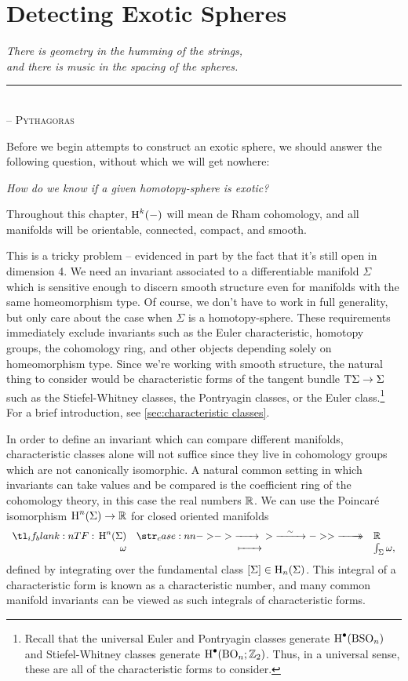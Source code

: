 \chapter{Detecting Exotic Spheres}

\begin{flushleft}
	\textsl{There is geometry in the humming of the strings,}\\
	\textsl{and there is music in the spacing of the spheres.}\\
	\rule[0pt]{21em}{0.5pt}\\
	-- \textsc{Pythagoras}\\
	\vspace{2em}
\end{flushleft}

Before we begin attempts to construct an exotic sphere, we should answer the following question, without which we will get nowhere:
\begin{center}
	\textsl{How do we know if a given homotopy-sphere is exotic?}
\end{center}

\begin{convention*}
	Throughout this chapter, $\operatorname{H}^k(-)$ will mean de Rham cohomology, and all manifolds will be orientable, connected, compact, and smooth.
\end{convention*}

This is a tricky problem -- evidenced in part by the fact that it's still open in dimension 4. We need an invariant associated to a differentiable manifold $\Sigma$ which is sensitive enough to discern smooth structure even for manifolds with the same homeomorphism type. Of course, we don't have to work in full generality, but only care about the case when $\Sigma$ is a homotopy-sphere. These requirements immediately exclude invariants such as the Euler characteristic, homotopy groups, the cohomology ring, and other objects depending solely on homeomorphism type. Since we're working with smooth structure, the natural thing to consider would be characteristic forms of the tangent bundle $\mathrm{T} \Sigma \to \Sigma$ such as the Stiefel-Whitney classes, the Pontryagin classes, or the Euler class.\footnote{Recall that the universal Euler and Pontryagin classes generate $\operatorname{H}^\bullet({\operatorname{BSO}}_n)$ and Stiefel-Whitney classes generate $\operatorname{H}^\bullet({\operatorname{BO}}_n; \mathbb{Z}_2)$. Thus, in a universal sense, these are all of the characteristic forms to consider.} For a brief introduction, see \cref{sec:characteristic classes}.

In order to define an invariant which can compare different manifolds, characteristic classes alone will not suffice since they live in cohomology groups which are not canonically isomorphic. A natural common setting in which invariants can take values and be compared is the coefficient ring of the cohomology theory, in this case the real numbers $\mathbb{R}$. We can use the Poincar\'e isomorphism $\operatorname{H}^n(\Sigma) \to \mathbb{R}$ for closed oriented manifolds
\[
	\lkxfunc{}{\H^n(\Sigma)}{\R}{\omega}{\int_\Sigma \omega,}
\]
defined by integrating over the fundamental class $[\Sigma]\in \operatorname{H}_n(\Sigma)$. This integral of a characteristic form is known as a characteristic number, and many common manifold invariants can be viewed as such integrals of characteristic forms.

